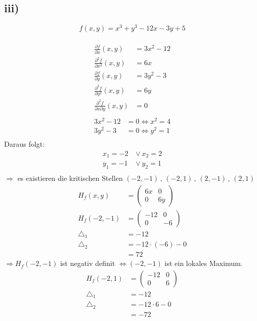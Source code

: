 \documentclass[a4paper]{scrartcl}
\begin{document}
\subsection{iii)}
\[f(x,y) = x^3+y^3-12x-3y+5\] \\
\begin{align}
\frac{\partial f}{\partial x}(x,y) &= 3x^2-12 \\
\frac{\partial ^2 f}{\partial x^2}(x,y) &= 6x \\
\frac{\partial f}{\partial y}(x,y) &= 3y^2-3 \\
\frac{\partial ^2 f}{\partial y^2}(x,y) &= 6y \\
\frac{\partial ^2 f}{\partial x\partial  y}(x,y) &= 0 \\
\end{align}
\begin{align}
3x^2-12 &= 0 \Leftrightarrow x^2 = 4 \\
3y^2-3 &= 0 \Leftrightarrow y^2 = 1 \\
\end{align}
Daraus folgt: \\
\begin{align}
x_1 = -2\ &\vee\ x_2 = 2 \\
y_1 = -1\ &\vee\ y_2 =1 \\
\end{align}
\(\Rightarrow\) es existieren die kritischen Stellen \((-2,-1)\,,\,(-2,1)\,,\,(2,-1)\,,\,(2,1)\) \\
\newpage
\begin{align}
H_f(x,y) &= \begin{pmatrix}
6x & 0 \\
0 & 6y
\end{pmatrix} \\
H_f(-2,-1) &= \begin{pmatrix}
-12 & 0 \\
0 & -6
\end{pmatrix} \\
\triangle_1 &= -12 \\
\triangle_2 &= -12 \cdot (-6) -0 \\
	&= 72 
\end{align}
\(\Rightarrow H_f(-2,-1)\) ist negativ definit \(\Leftrightarrow (-2,-1)\) ist ein lokales Maximum. \\
\begin{align}
H_f(-2,1) &= \begin{pmatrix}
-12 & 0 \\
0 & 6
\end{pmatrix} \\
\triangle_1 &= -12 \\
\triangle_2 &= -12 \cdot 6 -0 \\
	&= -72 
\end{align}
\end{document}

